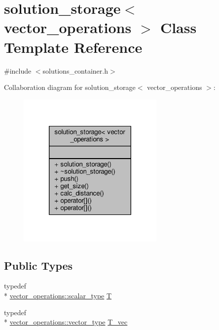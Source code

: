 \hypertarget{classsolution__storage}{\section{solution\-\_\-storage$<$ vector\-\_\-operations $>$ Class Template Reference}
\label{classsolution__storage}
}


{\ttfamily \#include $<$solutions\-\_\-container.\-h$>$}



Collaboration diagram for solution\-\_\-storage$<$ vector\-\_\-operations $>$\-:\nopagebreak
\begin{figure}[H]
\begin{center}
\leavevmode
\includegraphics[width=202pt]{classsolution__storage__coll__graph}
\end{center}
\end{figure}
\subsection*{Public Types}
\begin{DoxyCompactItemize}
\item 
typedef \\*
\hyperlink{structcpu__vector__operations_aca6b216aa1fb172df83d98350e94fd61}{vector\-\_\-operations\-::scalar\-\_\-type} \hyperlink{classsolution__storage_a8de9429eee6a772dca6a68e230943428}{T}
\item 
typedef \\*
\hyperlink{structcpu__vector__operations_a1962836df596ce262704d208e9a6d8f9}{vector\-\_\-operations\-::vector\-\_\-type} \hyperlink{classsolution__storage_ae62caec157857515e58957a7e0f02cef}{T\-\_\-vec}
\end{DoxyCompactItemize}
